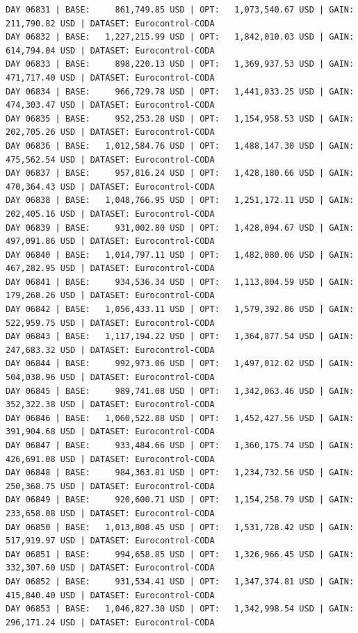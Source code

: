 \documentclass[11pt,a4paper]{article}
\begin{document}
\begin{verbatim}
DAY 06831 | BASE:     861,749.85 USD | OPT:   1,073,540.67 USD | GAIN: 211,790.82 USD | DATASET: Eurocontrol-CODA
DAY 06832 | BASE:   1,227,215.99 USD | OPT:   1,842,010.03 USD | GAIN: 614,794.04 USD | DATASET: Eurocontrol-CODA
DAY 06833 | BASE:     898,220.13 USD | OPT:   1,369,937.53 USD | GAIN: 471,717.40 USD | DATASET: Eurocontrol-CODA
DAY 06834 | BASE:     966,729.78 USD | OPT:   1,441,033.25 USD | GAIN: 474,303.47 USD | DATASET: Eurocontrol-CODA
DAY 06835 | BASE:     952,253.28 USD | OPT:   1,154,958.53 USD | GAIN: 202,705.26 USD | DATASET: Eurocontrol-CODA
DAY 06836 | BASE:   1,012,584.76 USD | OPT:   1,488,147.30 USD | GAIN: 475,562.54 USD | DATASET: Eurocontrol-CODA
DAY 06837 | BASE:     957,816.24 USD | OPT:   1,428,180.66 USD | GAIN: 470,364.43 USD | DATASET: Eurocontrol-CODA
DAY 06838 | BASE:   1,048,766.95 USD | OPT:   1,251,172.11 USD | GAIN: 202,405.16 USD | DATASET: Eurocontrol-CODA
DAY 06839 | BASE:     931,002.80 USD | OPT:   1,428,094.67 USD | GAIN: 497,091.86 USD | DATASET: Eurocontrol-CODA
DAY 06840 | BASE:   1,014,797.11 USD | OPT:   1,482,080.06 USD | GAIN: 467,282.95 USD | DATASET: Eurocontrol-CODA
DAY 06841 | BASE:     934,536.34 USD | OPT:   1,113,804.59 USD | GAIN: 179,268.26 USD | DATASET: Eurocontrol-CODA
DAY 06842 | BASE:   1,056,433.11 USD | OPT:   1,579,392.86 USD | GAIN: 522,959.75 USD | DATASET: Eurocontrol-CODA
DAY 06843 | BASE:   1,117,194.22 USD | OPT:   1,364,877.54 USD | GAIN: 247,683.32 USD | DATASET: Eurocontrol-CODA
DAY 06844 | BASE:     992,973.06 USD | OPT:   1,497,012.02 USD | GAIN: 504,038.96 USD | DATASET: Eurocontrol-CODA
DAY 06845 | BASE:     989,741.08 USD | OPT:   1,342,063.46 USD | GAIN: 352,322.38 USD | DATASET: Eurocontrol-CODA
DAY 06846 | BASE:   1,060,522.88 USD | OPT:   1,452,427.56 USD | GAIN: 391,904.68 USD | DATASET: Eurocontrol-CODA
DAY 06847 | BASE:     933,484.66 USD | OPT:   1,360,175.74 USD | GAIN: 426,691.08 USD | DATASET: Eurocontrol-CODA
DAY 06848 | BASE:     984,363.81 USD | OPT:   1,234,732.56 USD | GAIN: 250,368.75 USD | DATASET: Eurocontrol-CODA
DAY 06849 | BASE:     920,600.71 USD | OPT:   1,154,258.79 USD | GAIN: 233,658.08 USD | DATASET: Eurocontrol-CODA
DAY 06850 | BASE:   1,013,808.45 USD | OPT:   1,531,728.42 USD | GAIN: 517,919.97 USD | DATASET: Eurocontrol-CODA
DAY 06851 | BASE:     994,658.85 USD | OPT:   1,326,966.45 USD | GAIN: 332,307.60 USD | DATASET: Eurocontrol-CODA
DAY 06852 | BASE:     931,534.41 USD | OPT:   1,347,374.81 USD | GAIN: 415,840.40 USD | DATASET: Eurocontrol-CODA
DAY 06853 | BASE:   1,046,827.30 USD | OPT:   1,342,998.54 USD | GAIN: 296,171.24 USD | DATASET: Eurocontrol-CODA

\end{verbatim}
\end{document}
